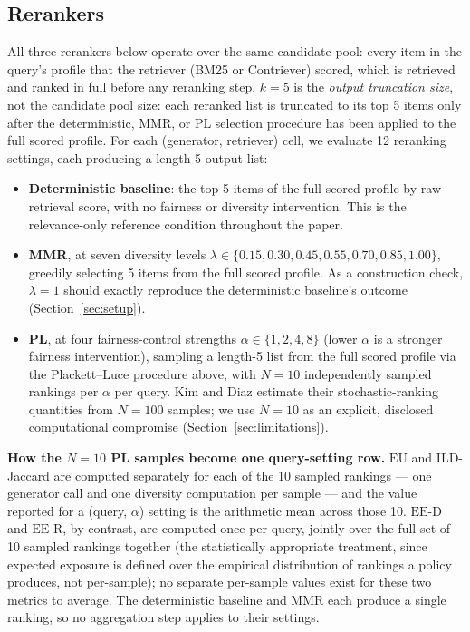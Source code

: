 \documentclass[11pt]{article}
\newcommand{\eed}{\ensuremath{\mathrm{EE\text{-}D}}}
\newcommand{\eer}{\ensuremath{\mathrm{EE\text{-}R}}}
\newcommand{\eu}{\ensuremath{\mathrm{EU}}}
\newcommand{\ild}{\ensuremath{\mathrm{ILD}}}
\begin{document}
\subsection{Rerankers}

All three rerankers below operate over the same candidate pool: every item
in the query's profile that the retriever (BM25 or Contriever) scored,
which is retrieved and ranked in full before any reranking step. $k=5$ is
the \emph{output truncation size}, not the candidate pool size: each
reranked list is truncated to its top 5 items only after the deterministic,
MMR, or PL selection procedure has been applied to the full scored
profile. For each (generator, retriever) cell, we evaluate 12 reranking
settings, each producing a length-5 output list:

\begin{itemize}
\item \textbf{Deterministic baseline}: the top 5 items of the full scored
  profile by raw retrieval score, with no fairness or diversity
  intervention. This is the relevance-only reference condition throughout
  the paper.
\item \textbf{MMR}, at seven diversity levels
  $\lambda \in \{0.15, 0.30, 0.45, 0.55, 0.70, 0.85, 1.00\}$, greedily
  selecting 5 items from the full scored profile. As a construction check,
  $\lambda=1$ should exactly reproduce the deterministic baseline's
  outcome (Section~\ref{sec:setup}).
\item \textbf{PL}, at four fairness-control strengths
  $\alpha \in \{1, 2, 4, 8\}$ (lower $\alpha$ is a stronger fairness
  intervention), sampling a length-5 list from the full scored profile via
  the Plackett--Luce procedure above, with $N=10$ independently sampled
  rankings per $\alpha$ per query. Kim and Diaz estimate their
  stochastic-ranking quantities from $N=100$ samples; we use $N=10$ as an
  explicit, disclosed computational compromise
  (Section~\ref{sec:limitations}).
\end{itemize}

\textbf{How the $N=10$ PL samples become one query-setting row.} \eu{} and
\ild{}-Jaccard are computed separately for each of the 10 sampled rankings
--- one generator call and one diversity computation per sample --- and
the value reported for a (query, $\alpha$) setting is the arithmetic mean
across those 10. \eed{} and \eer{}, by contrast, are computed once per
query, jointly over the full set of 10 sampled rankings together (the
statistically appropriate treatment, since expected exposure is defined
over the empirical distribution of rankings a policy produces, not
per-sample); no separate per-sample values exist for these two metrics to
average. The deterministic baseline and MMR each produce a single
ranking, so no aggregation step applies to their settings.
\end{document}
